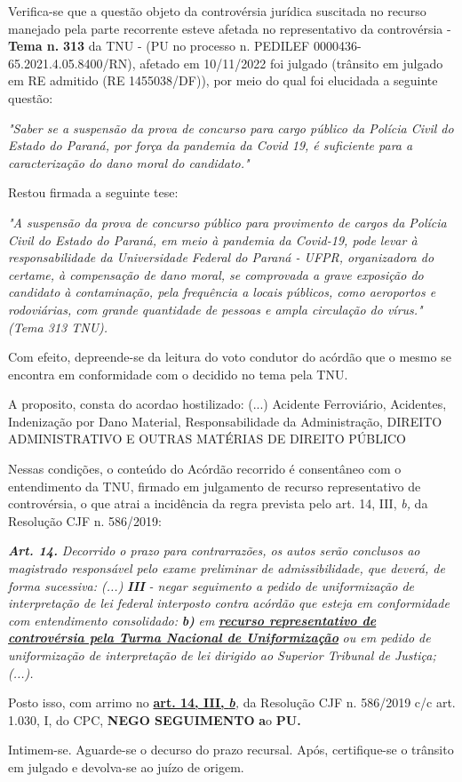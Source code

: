 \documentclass[12pt]{article}
\begin{document}
\justifying
\noindent Verifica-se que a questão objeto da controvérsia jurídica suscitada no recurso manejado pela parte recorrente esteve afetada no representativo da controvérsia - \textbf{Tema n. }\textbf{313} da TNU - (PU no processo n. PEDILEF 0000436-65.2021.4.05.8400/RN),  afetado em 10/11/2022 foi julgado (trânsito em julgado em RE admitido (RE 1455038/DF)), por meio do qual foi elucidada a seguinte questão:

\noindent \textit{"Saber se a suspensão da prova de concurso para cargo público da Polícia Civil do Estado do Paraná, por força da pandemia da Covid 19, é suficiente para a caracterização do dano moral do candidato."}

\noindent Restou firmada a seguinte tese:

\noindent \textit{"A suspensão da prova de concurso público para provimento de cargos da Polícia Civil do Estado do Paraná, em meio à pandemia da Covid-19, pode levar à responsabilidade da Universidade Federal do Paraná - UFPR, organizadora do certame, à compensação de dano moral, se comprovada a grave exposição do candidato à contaminação, pela frequência a locais públicos, como aeroportos e rodoviárias, com grande quantidade de pessoas e ampla circulação do vírus." (Tema 313 TNU).}

\noindent Com efeito, depreende-se da leitura do voto condutor do acórdão que o mesmo se encontra em conformidade com o decidido no  tema pela TNU.

\noindent A proposito, consta do acordao hostilizado: (...) Acidente Ferroviário, Acidentes, Indenização por Dano Material, Responsabilidade da Administração, DIREITO ADMINISTRATIVO E OUTRAS MATÉRIAS DE DIREITO PÚBLICO

\noindent Nessas condições, o conteúdo do Acórdão recorrido é consentâneo com o entendimento da TNU, firmado em julgamento de recurso representativo de controvérsia, o que atrai a incidência da regra prevista pelo art. 14, III, \textit{b,} da Resolução CJF n. 586/2019:

\noindent \textit{\textbf{Art. 14.}}\textit{ Decorrido o prazo para contrarrazões, os autos serão conclusos ao magistrado responsável pelo exame preliminar de admissibilidade, que deverá, de forma sucessiva: (...) }\textit{\textbf{III }}\textit{- negar seguimento a pedido de uniformização de interpretação de lei federal interposto contra acórdão que esteja em conformidade com entendimento consolidado: }\textit{\textbf{b)}}\textit{ em }\uline{\textit{\textbf{recurso representativo de controvérsia pela Turma Nacional de Uniformização}}}\textit{ ou em pedido de uniformização de interpretação de lei dirigido ao Superior Tribunal de Justiça;(...).}

\noindent Posto isso, com arrimo no \uline{\textbf{art. 14, III, }}\uline{\textit{\textbf{b}}}\textit{,} da Resolução CJF n. 586/2019 c/c art. 1.030, I, do CPC, \textbf{NEGO SEGUIMENTO }\textbf{a}o\textbf{ PU}\textbf{.}

\noindent Intimem-se. Aguarde-se o decurso do prazo recursal. Após, certifique-se o trânsito em julgado e devolva-se ao juízo de origem.
\end{document}
